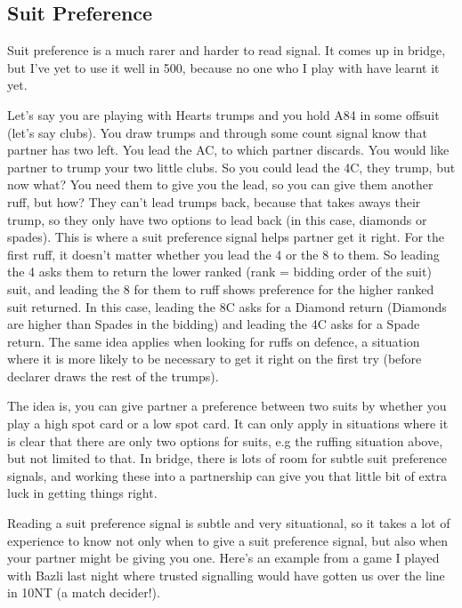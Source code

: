 \documentclass[a4paper]{report}
\theoremstyle{question}
\theoremstyle{theorem}
\theoremstyle{definition}
\newcommand{\<}{\left\langle}%
\renewcommand{\>}{\right\rangle}%
\begin{document}
\subsection*{Suit Preference}

Suit preference is a much rarer and harder to read signal. It comes up in bridge, but I've yet to use it well in 500, because no one who I play with have learnt it yet.

Let's say you are playing with Hearts trumps and you hold A84 in some offsuit (let's say clubs). You draw trumps and through some count signal know that partner has two left. You lead the AC, to which partner discards. You would like partner to trump your two little clubs. So you could lead the 4C, they trump, but now what? You need them to give you the lead, so you can give them another ruff, but how? They can't lead trumps back, because that takes aways their trump, so they only have two options to lead back (in this case, diamonds or spades). This is where a suit preference signal helps partner get it right. For the first ruff, it doesn't matter whether you lead the 4 or the 8 to them. So leading the 4 asks them to return the lower ranked (rank = bidding order of the suit) suit, and leading the 8 for them to ruff shows preference for the higher ranked suit returned. In this case, leading the 8C asks for a Diamond return (Diamonds are higher than Spades in the bidding) and leading the 4C asks for a Spade return. The same idea applies when looking for ruffs on defence, a situation where it is more likely to be necessary to get it right on the first try (before declarer draws the rest of the trumps).

The idea is, you can give partner a preference between two suits by whether you play a high spot card or a low spot card. It can only apply in situations where it is clear that there are only two options for suits, e.g the ruffing situation above, but not limited to that. In bridge, there is lots of room for subtle suit preference signals, and working these into a partnership can give you that little bit of extra luck in getting things right. 

Reading a suit preference signal is subtle and very situational, so it takes a lot of experience to know not only when to give a suit preference signal, but also when your partner might be giving you one. Here's an example from a game I played with Bazli last night where trusted signalling would have gotten us over the line in 10NT (a match decider!).
\end{document}
